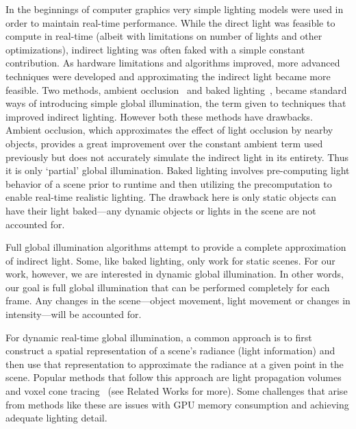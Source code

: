 In the beginnings of computer graphics very simple lighting models were used in order to maintain real-time performance. While the direct light was feasible to compute in real-time (albeit with limitations on number of lights and other optimizations), indirect lighting was often faked with a simple constant contribution. As hardware limitations and algorithms improved, more advanced techniques were developed and approximating the indirect light became more feasible. Two methods, ambient occlusion~\cite{bunnell2005dynamic,moller2008rtr} and baked lighting~\cite{Sloan:2002:PRT:566654.566612,moller2008rtr}, became standard ways of introducing simple global illumination, the term given to techniques that improved indirect lighting. However both these methods have drawbacks. Ambient occlusion, which approximates the effect of light occlusion by nearby objects, provides a great improvement over the constant ambient term used previously but does not accurately simulate the indirect light in its entirety. Thus it is only `partial' global illumination. Baked lighting involves pre-computing light behavior of a scene prior to runtime and then utilizing the precomputation to enable real-time realistic lighting. The drawback here is only static objects can have their light baked---any dynamic objects or lights in the scene are not accounted for.

Full global illumination algorithms attempt to provide a complete approximation of indirect light. Some, like baked lighting, only work for static scenes. For our work, however, we are interested in dynamic global illumination. In other words, our goal is full global illumination that can be performed completely for each frame. Any changes in the scene---object movement, light movement or changes in intensity---will be accounted for.

For dynamic real-time global illumination, a common approach is to first construct a spatial representation of a scene's radiance (light information) and then use that representation to approximate the radiance at a given point in the scene. Popular methods that follow this approach are light propagation volumes~\cite{Kaplanyan:2010:CLP:1730804.1730821} and voxel cone tracing~\cite{crassin2011interactive} (see Related Works for more). Some challenges that arise from methods like these are issues with GPU memory consumption and achieving adequate lighting detail. %

